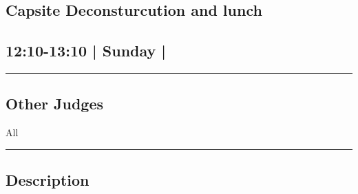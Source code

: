 \documentclass[10pt, A5]{article}
\begin{document}
		\begin{framed}
			\begin{minipage}{\textwidth}

			\setcounter{section}{113}
							\section{Capsite Deconsturcution and lunch}
						
			\subsection*{12:10-13:10 | Sunday | }

			\vspace{0.25cm}
			\hrule
			\vspace{0.25cm}


			\subsection*{Other Judges}
							All

					\vspace{0.25cm}
			\hrule
			\vspace{0.25cm}

			\begin{minipage}{\textwidth}
			\subsection*{\faListAlt \: Description}
			
			\end{minipage}


	\end{minipage}
	\end{framed}

	
\end{document}
